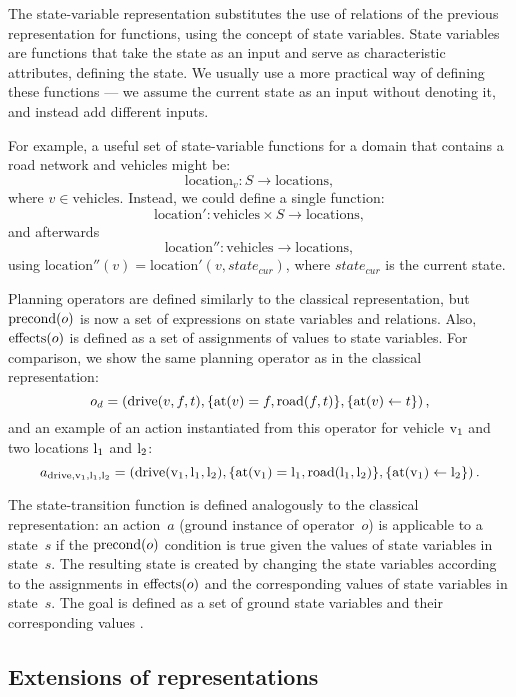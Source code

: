 The state-variable representation substitutes the use of relations of the previous
representation for functions,
using the concept of state variables. State variables are functions
that take the state as an input and serve as characteristic attributes, defining the state. We usually use a more practical way of defining these functions --- we assume
the current state as an input without denoting it, and instead add different inputs.

For example, a useful set of state-variable functions for a domain that contains a road
network and vehicles might be: $$\mathrm{location}_{v}: S \to \mathrm{locations},$$
where $v \in \mathrm{vehicles}$.
Instead, we could define a single function:
$$\mathrm{location'}: \mathrm{vehicles} \times S \to \mathrm{locations},$$
and afterwards 
$$\mathrm{location''}: \mathrm{vehicles} \to \mathrm{locations},$$
using $\mathrm{location''}(v) = \mathrm{location'}(v, state_{cur})$, where $state_{cur}$ is the current state.

Planning operators are defined similarly to the classical representation, but
$\operatorname{\textrm{precond}}(o)$ is now a set of expressions on state variables and relations.
Also, $\operatorname{\textrm{effects}}(o)$ is defined as a set of assignments of values to state variables.
For comparison, we show the same planning operator as in the classical representation:
$$o_d = \left(\textrm{drive}(v, f, t), \{\textrm{at}(v) = f, \textrm{road}(f, t)\}, \{\textrm{at}(v) \leftarrow t\}\right),$$
and an example of an action instantiated from this operator
for vehicle $\textrm{v}_1$ and two locations $\textrm{l}_1$ and $\textrm{l}_2$:
$$a_{\textrm{drive}, \textrm{v}_1, \textrm{l}_1, \textrm{l}_2} = \left(\textrm{drive}(\textrm{v}_1, \textrm{l}_1, \textrm{l}_2), \{\textrm{at}(\textrm{v}_1) = \textrm{l}_1,
\textrm{road}(\textrm{l}_1, \textrm{l}_2)\}, \{\textrm{at}(\textrm{v}_1) \leftarrow \textrm{l}_2\}\right).$$

The state-transition function is defined analogously to the classical representation: an action~$a$ (ground instance
of operator~$o$)
is applicable to a state~$s$ if the $\operatorname{\textrm{precond}}(o)$ condition is true given the values
of state variables in state~$s$. The resulting state is created by changing the state variables
according to the assignments in $\operatorname{\textrm{effects}}(o)$ and the corresponding values of state
variables in state~$s$.
The goal is defined as a set of ground state variables and their corresponding values
\citep[Section~2.5.2]{Ghallab2004}.

\subsection{Extensions of representations}

